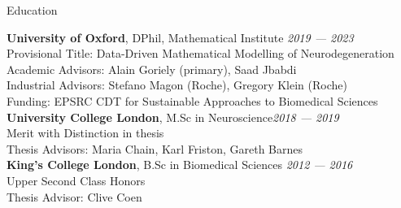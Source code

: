 \begin{rSection}{Education}

{\bf University of Oxford}, DPhil, Mathematical Institute  \hfill {\em 2019 — 2023} \\
Provisional Title: Data-Driven Mathematical Modelling of Neurodegeneration \\
Academic Advisors: Alain Goriely (primary), Saad Jbabdi \\
Industrial Advisors: Stefano Magon (Roche), Gregory Klein (Roche)\\
Funding: EPSRC CDT for Sustainable Approaches to Biomedical Sciences \\

{\bf University College London},  M.Sc in Neuroscience\hfill {\em 2018 — 2019} \\ 
Merit with Distinction in thesis \\
Thesis Advisors: Maria Chain, Karl Friston, Gareth Barnes \\

{\bf King's College London}, B.Sc in Biomedical Sciences \hfill {\em 2012 — 2016} \\ 
Upper Second Class Honors \\
Thesis Advisor: Clive Coen

\end{rSection}

